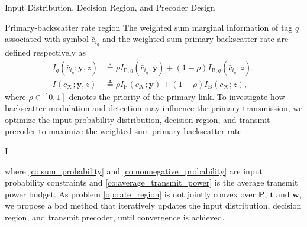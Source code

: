 \documentclass[journal]{IEEEtran}
\begin{document}
	\begin{section}{Input Distribution, Decision Region, and Precoder Design}
		\begin{subsection}{Primary-backscatter rate region}
			The weighted sum marginal information of tag $q$ associated with symbol $\bar{c}_{i_q}$ and the weighted sum primary-backscatter rate are defined respectively as
			\begin{align}
				I_q(\bar{c}_{i_q};\boldsymbol{y},z)
				& \triangleq \rho I_{\mathrm{P},q}(\bar{c}_{i_q};\boldsymbol{y}) + (1 - \rho) I_{\mathrm{B},q}(\bar{c}_{i_q};z),\label{eq:weighted_sum_marginal_information}\\
				I(c_{\mathcal{K}};\boldsymbol{y},z)
				& \triangleq \rho I_{\mathrm{P}}(c_{\mathcal{K}};\boldsymbol{y}) + (1 - \rho) I_{\mathrm{B}}(c_{\mathcal{K}};z),\label{eq:weighted_sum_rate}
			\end{align}
			where $\rho \in [0,1]$ denotes the priority of the primary link. To investigate how backscatter modulation and detection may influence the primary transmission, we optimize the input probability distribution, decision region, and transmit precoder to maximize the weighted sum primary-backscatter rate
			\begin{maxi!}
				{}{I}{\label{op:rate_region}}{\label{ob:weighted_sum_rate}}
			\end{maxi!}
			where \eqref{co:sum_probability} and \eqref{co:nonnegative_probability} are input probability constraints and \eqref{co:average_transmit_power} is the average transmit power budget. As problem \eqref{op:rate_region} is not jointly convex over $\boldsymbol{P}$, $\boldsymbol{t}$ and $\boldsymbol{w}$, we propose a \gls{bcd} method that iteratively updates the input distribution, decision region, and transmit precoder, until convergence is achieved.
		\end{subsection}


\end{section}
\end{document}
